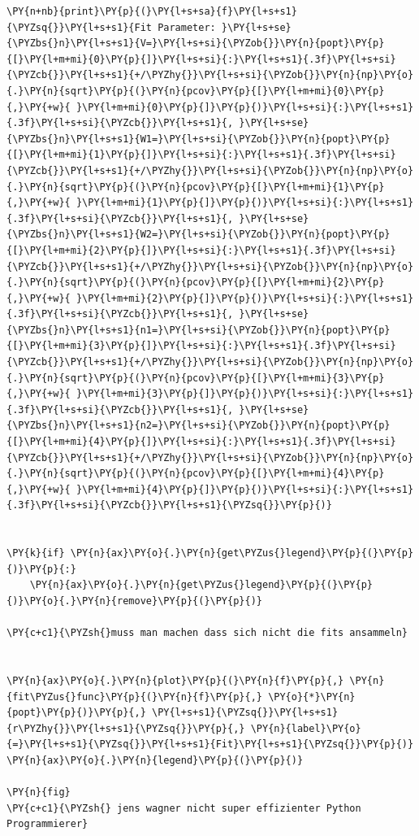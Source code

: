 \begin{tcolorbox}[breakable, size=fbox, boxrule=1pt, pad at break*=1mm,colback=cellbackground, colframe=cellborder]
\begin{Verbatim}[commandchars=\\\{\}]
\PY{n+nb}{print}\PY{p}{(}\PY{l+s+sa}{f}\PY{l+s+s1}{\PYZsq{}}\PY{l+s+s1}{Fit Parameter: }\PY{l+s+se}{\PYZbs{}n}\PY{l+s+s1}{V=}\PY{l+s+si}{\PYZob{}}\PY{n}{popt}\PY{p}{[}\PY{l+m+mi}{0}\PY{p}{]}\PY{l+s+si}{:}\PY{l+s+s1}{.3f}\PY{l+s+si}{\PYZcb{}}\PY{l+s+s1}{+/\PYZhy{}}\PY{l+s+si}{\PYZob{}}\PY{n}{np}\PY{o}{.}\PY{n}{sqrt}\PY{p}{(}\PY{n}{pcov}\PY{p}{[}\PY{l+m+mi}{0}\PY{p}{,}\PY{+w}{ }\PY{l+m+mi}{0}\PY{p}{]}\PY{p}{)}\PY{l+s+si}{:}\PY{l+s+s1}{.3f}\PY{l+s+si}{\PYZcb{}}\PY{l+s+s1}{, }\PY{l+s+se}{\PYZbs{}n}\PY{l+s+s1}{W1=}\PY{l+s+si}{\PYZob{}}\PY{n}{popt}\PY{p}{[}\PY{l+m+mi}{1}\PY{p}{]}\PY{l+s+si}{:}\PY{l+s+s1}{.3f}\PY{l+s+si}{\PYZcb{}}\PY{l+s+s1}{+/\PYZhy{}}\PY{l+s+si}{\PYZob{}}\PY{n}{np}\PY{o}{.}\PY{n}{sqrt}\PY{p}{(}\PY{n}{pcov}\PY{p}{[}\PY{l+m+mi}{1}\PY{p}{,}\PY{+w}{ }\PY{l+m+mi}{1}\PY{p}{]}\PY{p}{)}\PY{l+s+si}{:}\PY{l+s+s1}{.3f}\PY{l+s+si}{\PYZcb{}}\PY{l+s+s1}{, }\PY{l+s+se}{\PYZbs{}n}\PY{l+s+s1}{W2=}\PY{l+s+si}{\PYZob{}}\PY{n}{popt}\PY{p}{[}\PY{l+m+mi}{2}\PY{p}{]}\PY{l+s+si}{:}\PY{l+s+s1}{.3f}\PY{l+s+si}{\PYZcb{}}\PY{l+s+s1}{+/\PYZhy{}}\PY{l+s+si}{\PYZob{}}\PY{n}{np}\PY{o}{.}\PY{n}{sqrt}\PY{p}{(}\PY{n}{pcov}\PY{p}{[}\PY{l+m+mi}{2}\PY{p}{,}\PY{+w}{ }\PY{l+m+mi}{2}\PY{p}{]}\PY{p}{)}\PY{l+s+si}{:}\PY{l+s+s1}{.3f}\PY{l+s+si}{\PYZcb{}}\PY{l+s+s1}{, }\PY{l+s+se}{\PYZbs{}n}\PY{l+s+s1}{n1=}\PY{l+s+si}{\PYZob{}}\PY{n}{popt}\PY{p}{[}\PY{l+m+mi}{3}\PY{p}{]}\PY{l+s+si}{:}\PY{l+s+s1}{.3f}\PY{l+s+si}{\PYZcb{}}\PY{l+s+s1}{+/\PYZhy{}}\PY{l+s+si}{\PYZob{}}\PY{n}{np}\PY{o}{.}\PY{n}{sqrt}\PY{p}{(}\PY{n}{pcov}\PY{p}{[}\PY{l+m+mi}{3}\PY{p}{,}\PY{+w}{ }\PY{l+m+mi}{3}\PY{p}{]}\PY{p}{)}\PY{l+s+si}{:}\PY{l+s+s1}{.3f}\PY{l+s+si}{\PYZcb{}}\PY{l+s+s1}{, }\PY{l+s+se}{\PYZbs{}n}\PY{l+s+s1}{n2=}\PY{l+s+si}{\PYZob{}}\PY{n}{popt}\PY{p}{[}\PY{l+m+mi}{4}\PY{p}{]}\PY{l+s+si}{:}\PY{l+s+s1}{.3f}\PY{l+s+si}{\PYZcb{}}\PY{l+s+s1}{+/\PYZhy{}}\PY{l+s+si}{\PYZob{}}\PY{n}{np}\PY{o}{.}\PY{n}{sqrt}\PY{p}{(}\PY{n}{pcov}\PY{p}{[}\PY{l+m+mi}{4}\PY{p}{,}\PY{+w}{ }\PY{l+m+mi}{4}\PY{p}{]}\PY{p}{)}\PY{l+s+si}{:}\PY{l+s+s1}{.3f}\PY{l+s+si}{\PYZcb{}}\PY{l+s+s1}{\PYZsq{}}\PY{p}{)}


\PY{k}{if} \PY{n}{ax}\PY{o}{.}\PY{n}{get\PYZus{}legend}\PY{p}{(}\PY{p}{)}\PY{p}{:}
    \PY{n}{ax}\PY{o}{.}\PY{n}{get\PYZus{}legend}\PY{p}{(}\PY{p}{)}\PY{o}{.}\PY{n}{remove}\PY{p}{(}\PY{p}{)}
    
\PY{c+c1}{\PYZsh{}muss man machen dass sich nicht die fits ansammeln}


\PY{n}{ax}\PY{o}{.}\PY{n}{plot}\PY{p}{(}\PY{n}{f}\PY{p}{,} \PY{n}{fit\PYZus{}func}\PY{p}{(}\PY{n}{f}\PY{p}{,} \PY{o}{*}\PY{n}{popt}\PY{p}{)}\PY{p}{,} \PY{l+s+s1}{\PYZsq{}}\PY{l+s+s1}{r\PYZhy{}}\PY{l+s+s1}{\PYZsq{}}\PY{p}{,} \PY{n}{label}\PY{o}{=}\PY{l+s+s1}{\PYZsq{}}\PY{l+s+s1}{Fit}\PY{l+s+s1}{\PYZsq{}}\PY{p}{)}
\PY{n}{ax}\PY{o}{.}\PY{n}{legend}\PY{p}{(}\PY{p}{)}

\PY{n}{fig}
\PY{c+c1}{\PYZsh{} jens wagner nicht super effizienter Python Programmierer}
\end{Verbatim}
\end{tcolorbox}


